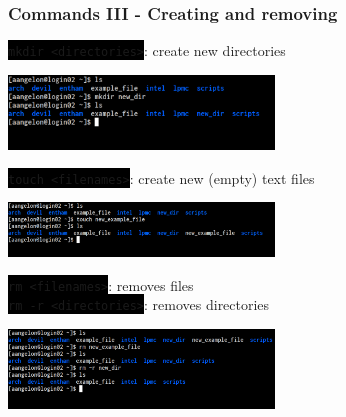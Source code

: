 \documentclass[unknownkeysallowed, 10pt, a4 paper, handout]{beamer}
\newcommand{\code}[1]{\colorbox{black}{\color{green}\texttt{#1}}}
\begin{document}
\begin{frame}[c]
  \begin{center}
    \frametitle{Commands III - Creating and removing}
    \code{mkdir <directories>}: create new directories
    \vspace{-4mm}

    \begin{center}
      \includegraphics[width=0.53\textwidth]{pics/mkdir.png}
    \end{center}

    \code{touch <filenames>}: create new (empty) text files
    \vspace{-4mm}

    \begin{center}
      \includegraphics[width=0.53\textwidth]{pics/touch.png}
    \end{center}

    \code{rm <filenames>}: removes files\\
    \code{rm -r <directories>}: removes directories
    \vspace{-4.5mm}

    \begin{center}
      \includegraphics[width=0.53\textwidth]{pics/rm.png}
    \end{center}
    \vspace{-2mm}
  \end{center}
\end{frame}
\end{document}
